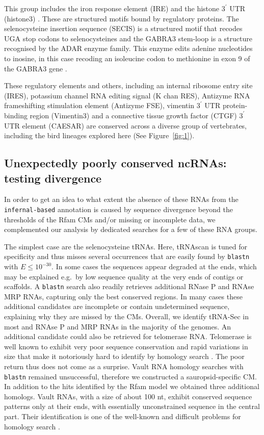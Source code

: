 \documentclass[10pt]{bmc_article}
\newenvironment{bmcformat}{\begin{raggedright}\baselineskip20pt\sloppy\setboolean{publ}{false}}{\end{raggedright}\baselineskip20pt\sloppy}
\begin{document}
\begin{bmcformat}
This group includes the iron response element (IRE) \cite{Stevens:}
and the histone $3^\prime$ UTR (histone3)
\cite{Davila_Lopez:2008a}. These are structured motifs bound by
regulatory proteins. The selenocysteine insertion sequence (SECIS) is
a structured motif that recodes UGA stop codons to selenocysteines
\cite{Lambert:2002} and the GABRA3 stem-loop is a structure recognised
by the ADAR enzyme family. This enzyme edits adenine nucleotides to
inosine, in this case recoding an isoleucine codon to methionine in
exon 9 of the GABRA3 gene \cite{Ohlson:2007}.

These regulatory elements and others, including an internal ribosome
entry site (IRES), potassium channel RNA editing signal (K chan RES),
Antizyme RNA frameshifting stimulation element (Antizyme FSE),
vimentin $3^\prime$ UTR protein-binding region (Vimentin3) and a
connective tissue growth factor (CTGF) $3^\prime$ UTR element (CAESAR)
are conserved across a diverse group of vertebrates, including the
bird lineages explored here (See Figure~\ref{fig:1}).

\subsection*{Unexpectedly poorly conserved  ncRNAs: testing divergence}

In order to get an idea to what extent the
absence of these RNAs from the \texttt{infernal-based} annotation is
caused by sequence divergence beyond the thresholds of the Rfam CMs
and/or missing or incomplete data, we complemented our analysis by
dedicated searches for a few of these RNA groups.

The simplest case are the selenocysteine tRNAs. Here, tRNAscan is
tuned for specificity and thus misses several occurrences that are
easily found by \texttt{blastn} with $E\le 10^{-30}$. In some cases
the sequences appear degraded at the ends, which may be explained
e.g.\ by low sequence quality at the very ends of contigs or
scaffolds. A \texttt{blastn} search also readily retrieves additional
RNase P and RNAse MRP RNAs, capturing only the best conserved
regions. In many cases these additional candidates are incomplete or
contain undetermined sequence, explaining why they are missed by the
CMs. Overall, we identify tRNA-Sec in most and RNAse P and MRP RNAs in
the majority of the genomes. An additional candidate could also be
retrieved for telomerase RNA. Telomerase is well known to exhibit very
poor sequence conservation and rapid variations in size that make it
notoriously hard to identify by homology search \cite{Xie:08a}. The
poor return thus does not come as a surprise. Vault RNA homology
searches with \texttt{blastn} remained unsuccessful, therefore we
constructed a sauropsid-specific CM.  In addition to the hits
identified by the Rfam model we obtained three additional
homologs. Vault RNAs, with a size of about 100 nt, exhibit conserved
sequence patterns only at their ends, with essentially unconstrained
sequence in the central part. Their identification is one of the
well-known and difficult problems for homology search
\cite{Stadler:09b,Kolbe:2009}.


\end{bmcformat}
\end{document}
